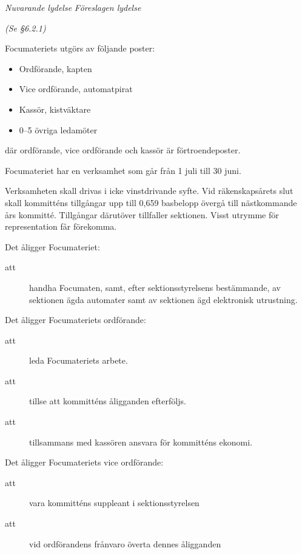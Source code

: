 \documentclass{article}
\newenvironment{lydelse}
    {\begin{paracol}{2}%
        \emph{Nuvarande lydelse}%
        \switchcolumn%
        \emph{Föreslagen lydelse}%
    \end{paracol}%
    \begin{enumerate}[label=\thesubsection.\arabic*]%
    \begin{paracol}{2}%
    }{\end{paracol}\end{enumerate}}
\begin{document}
\begin{lydelse}

    \item[] \emph{(Se \S6.2.1)}
    
    \setcounter{section}{6}
    \setcounter{subsection}{8}
    
    \item Focumateriets utgörs av följande poster:
	\begin{itemize}
		\item Ordförande, kapten
		\item Vice ordförande, automatpirat
		\item Kassör, kistväktare
		\item 0--5 övriga ledamöter
	\end{itemize}
    där ordförande, vice ordförande och kassör är förtroendeposter.
    
    \item Focumateriet har en verksamhet som går från 1 juli till 30 juni.

	\item Verksamheten skall drivas i icke vinstdrivande syfte. Vid räkenskapsårets slut skall kommitténs tillgångar upp till 0,659 basbelopp övergå till nästkommande års kommitté. Tillgångar därutöver tillfaller sektionen. Visst utrymme för representation får förekomma.
    
    \item Det åligger Focumateriet:
	\begin{description}
		\item[att] handha Focumaten, samt, efter sektionsstyrelsens bestämmande, av sektionen ägda automater samt av sektionen ägd elektronisk utrustning.
	\end{description}
	
	\item Det åligger Focumateriets ordförande:
	\begin{description}
		\item[att] leda Focumateriets arbete.
		\item[att] tillse att kommitténs åligganden efterföljs.
		\item[att] tillsammans med kassören ansvara för kommitténs ekonomi.
	\end{description}

    \item Det åligger Focumateriets vice ordförande:
	\begin{description}
		\item[att] vara kommitténs suppleant i sektionsstyrelsen
		\item[att] vid ordförandens frånvaro överta dennes åligganden
	\end{description}


\end{lydelse}
\end{document}
